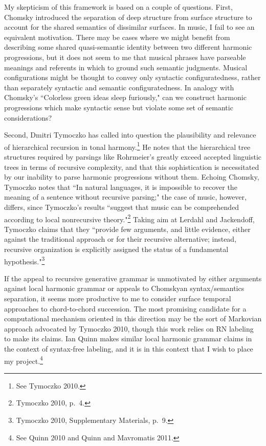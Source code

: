 My skepticism of this framework is based on a couple of questions.  First, Chomsky introduced the separation of deep structure from surface structure to account for the shared semantics of dissimilar surfaces.  In music, I fail to see an equivalent motivation.  There may be cases where we might benefit from describing some shared quasi-semantic identity between two different harmonic progressions, but it does not seem to me that musical phrases have parseable meanings and referents in which to ground such semantic judgments.  Musical configurations might be thought to convey only syntactic configuratedness, rather than separately syntactic and semantic configuratedness.  In analogy with Chomsky's ``Colorless green ideas sleep furiously," can we construct harmonic progressions which make syntactic sense but violate some set of semantic considerations?

Second, Dmitri Tymoczko has called into question the plausibility and relevance of hierarchical recursion in tonal harmony.\footnote{See Tymoczko 2010.}  He notes that the hierarchical tree structures required by parsings like Rohrmeier's greatly exceed accepted linguistic trees in terms of recursive complexity, and that this sophistication is necessitated by our inability to parse harmonic progressions without them.  Echoing Chomsky, Tymoczko notes that ``In natural languages, it is impossible to recover the meaning of a sentence without recursive parsing;" the case of music, however, differs, since Tymoczko's results ``suggest that music can be comprehended according to local nonrecursive theory."\footnote{Tymoczko 2010, p.\ 4.}  Taking aim at Lerdahl and Jackendoff, Tymoczko claims that they ``provide few arguments, and little evidence, either against the traditional approach or for their recursive alternative; instead, recursive organization is explicitly assigned the status of a fundamental hypothesis."\footnote{Tymoczko 2010, Supplementary Materials, p.\ 9.}

If the appeal to recursive generative grammar is unmotivated by either arguments against local harmonic grammar or appeals to Chomskyan syntax/semantics separation, it seems more productive to me to consider surface temporal approaches to chord-to-chord succession.  The most promising candidate for a computational mechanism oriented in this direction may be the sort of Markovian approach advocated by Tymoczko 2010, though this work relies on RN labeling to make its claims.  Ian Quinn makes similar local harmonic grammar claims in the context of syntax-free labeling, and it is in this context that I wish to place my project.\footnote{See Quinn 2010 and Quinn and Mavromatis 2011.}

